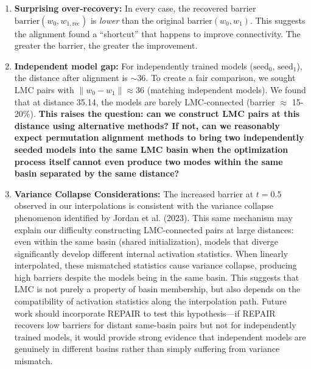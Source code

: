 \documentclass[11pt,a4paper]{article}
\begin{document}
\begin{enumerate}
    \item \textbf{Surprising over-recovery:} In every case, the recovered barrier $\text{barrier}(w_0, w_{1,\text{rec}})$ is \textit{lower} than the original $\text{barrier}(w_0, w_1)$. This suggests the alignment found a ``shortcut'' that happens to improve connectivity. The greater the barrier, the greater the improvement.
    
    \item \textbf{Independent model gap:} For independently trained models ($\text{seed}_0$, $\text{seed}_1$), the distance after alignment is $\sim$36. To create a fair comparison, we sought LMC pairs with $\|w_0 - w_1\| \approx 36$ (matching independent models). We found that at distance 35.14, the models are barely LMC-connected (barrier $\approx$ 15-20\%). \textbf{This raises the question: can we construct LMC pairs at this distance using alternative methods? If not, can we reasonably expect permutation alignment methods to bring two independently seeded models into the same LMC basin when the optimization process itself cannot even produce two modes within the same basin separated by the same distance?}

    \item \textbf{Variance Collapse Considerations:} The increased barrier at $t=0.5$ observed in our interpolations is consistent with the variance collapse phenomenon identified by Jordan et al. (2023). This same mechanism may explain our difficulty constructing LMC-connected pairs at large distances: even within the same basin (shared initialization), models that diverge significantly develop different internal activation statistics. When linearly interpolated, these mismatched statistics cause variance collapse, producing high barriers despite the models being in the same basin. This suggests that LMC is not purely a property of basin membership, but also depends on the compatibility of activation statistics along the interpolation path. Future work should incorporate REPAIR to test this hypothesis—if REPAIR recovers low barriers for distant same-basin pairs but not for independently trained models, it would provide strong evidence that independent models are genuinely in different basins rather than simply suffering from variance mismatch.

\end{enumerate}
\end{document}
